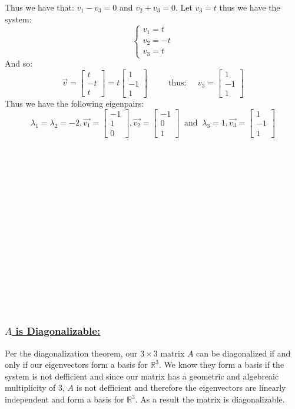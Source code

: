 \documentclass{article}
\begin{document}
Thus we have that: $v_{1}-v_{3}=0$ and $v_{2}+v_{3}=0$. Let $v_{3}=t$ thus we have the system: $$\begin{cases}
v_{1}=t\\
v_{2}=-t\\
v_{3}=t
\end{cases}$$ And so:
$$\vec{v}=\begin{bmatrix} 
t\\-t\\t
\end{bmatrix}=t\begin{bmatrix} 
1\\-1\\1
\end{bmatrix}\;\;\;\;\;\;\;\;\;\text{thus:}\;\;\;\;\;v_{3}=\begin{bmatrix} 
1\\-1\\1
\end{bmatrix}$$
Thus we have the following eigenpairs: $$
\lambda_{1}=\lambda_{2}=-2,\vec{v_{1}}=\begin{bmatrix} 
-1\\1\\0
\end{bmatrix},\vec{v_{2}}=\begin{bmatrix} 
-1\\0\\1
\end{bmatrix}\;\;\text{and}\;\;\lambda_{3}=1,\vec{v_3}=\begin{bmatrix} 
1\\-1\\1
\end{bmatrix}$$\\\\\\\\\\\\\\\\\\\\\\\\\\\\\\
\subsubsection*{\textbf{\underline{$A$ is Diagonalizable:}}}
Per the diagonalization theorem, our $3\times 3$ matrix $A$ can be diagonalized if and only if our eigenvectors form a basis for $\mathbb{R}^{3}$. 
We know they form a basis if the system is not defficient and since our matrix has a geometric and algebreaic multiplicity of $3$, $A$ is not defficient 
and therefore the eigenvectors are linearly independent and form a basis for $\mathbb{R}^{3}$. As a result the matrix is diagonalizable. 
\end{document}
